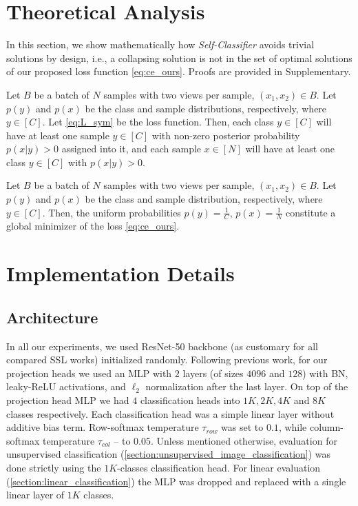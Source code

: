\documentclass[runningheads]{llncs}
\begin{document}
\section{Theoretical Analysis}
\label{section:theoretical}
In this section, we show mathematically how \textit{Self-Classifier} avoids trivial solutions by design, i.e., a collapsing solution is not in the set of optimal solutions of our proposed loss function \cref{eq:ce_ours}. Proofs are provided in Supplementary.

\begin{theorem}
\label{theorem:non_zero_prob}
Let $B$ be a batch of $N$ samples with two views per sample, $(x_1, x_2) \in B$. Let $p(y)$ and $p(x)$ be the class and sample distributions, respectively, where $y \in [C]$. Let \cref{eq:L_sym} be the loss function. Then, each class $y \in [C]$ will have at least one sample $y \in [C]$ with non-zero posterior probability $p(x|y) > 0$ assigned into it, and each sample $x \in [N]$ will have at least one class  $y \in [C]$ with $p(x|y) > 0$.
\end{theorem}

\begin{theorem}
\label{theorem:custom_optimal_sol}
Let $B$ be a batch of $N$ samples with two views per sample, $(x_1, x_2) \in B$. Let $p(y)$ and $p(x)$ be the class and sample distribution, respectively, where $y \in [C]$. Then, the uniform probabilities $p(y) = \frac{1}{C}$, $p(x) = \frac{1}{N}$ constitute a global minimizer of the loss \cref{eq:ce_ours}.
\end{theorem}

\section{Implementation Details}
\subsection{Architecture}
\label{section:implementation_details_arch}
In all our experiments, we used ResNet-50 \cite{he2016deep} backbone (as customary for all compared SSL works) initialized randomly. Following previous work, for our projection heads we used an MLP with $2$ layers (of sizes $4096$ and $128$) with BN, leaky-ReLU activations, and $\ell_2$ normalization after the last layer.
On top of the projection head MLP we had $4$ classification heads into $1K, 2K, 4K$ and $8K$ classes respectively. Each classification head was a simple linear layer without additive bias term. Row-softmax temperature $\tau_{row}$ was set to $0.1$, while column-softmax temperature $\tau_{col}$ -- to $0.05$. Unless mentioned otherwise, evaluation for unsupervised classification (\cref{section:unsupervised_image_classification}) was done strictly using the $1K$-classes classification head. For linear evaluation (\cref{section:linear_classification}) the MLP was dropped and replaced with a single linear layer of $1K$ classes.  
\end{document}
